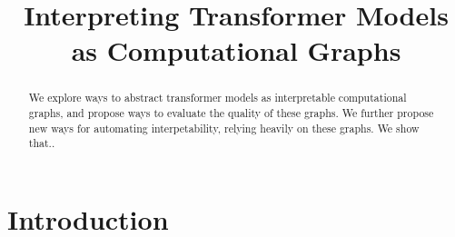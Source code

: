\documentclass{article}
\begin{document}

\title{Interpreting Transformer Models as Computational Graphs}
\author{}
\date{}
\maketitle


\begin{abstract}
We explore ways to abstract transformer models as interpretable computational graphs, and propose ways to evaluate the quality of these graphs. We further propose new ways for automating interpetability, relying heavily on these graphs. We show that..
\end{abstract}

\section{Introduction}






\end{document}
